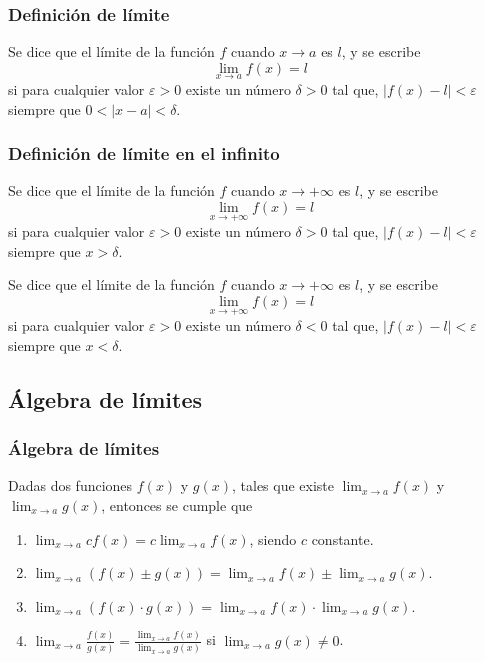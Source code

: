 \begin{frame}
	\frametitle{Definición de límite}
	\begin{definicion}
		Se dice que el límite de la función $f$ cuando $x\rightarrow a$ es $l$, y se escribe
		\[\lim_{x\rightarrow a} f(x) =l\]
		si para cualquier valor $\varepsilon>0$ existe un número $\delta>0$ tal que, $|f(x)-l|<\varepsilon$ siempre que $0<|x-a|<\delta$.
	\end{definicion}
	
	\begin{center}
		\scalebox{1}{}
	\end{center}
\end{frame}


\begin{frame}
	\frametitle{Definición de límite en el infinito}
	\begin{definicion}
		Se dice que el límite de la función $f$ cuando $x\rightarrow +\infty$ es $l$, y se escribe
		\[\lim_{x\rightarrow +\infty} f(x) =l\]
		si para cualquier valor $\varepsilon>0$ existe un número $\delta>0$ tal que, $|f(x)-l|<\varepsilon$ siempre que $x>\delta$.
		
		Se dice que el límite de la función $f$ cuando $x\rightarrow +\infty$ es $l$, y se escribe
		\[\lim_{x\rightarrow +\infty} f(x) =l\]
		si para cualquier valor $\varepsilon>0$ existe un número $\delta<0$ tal que, $|f(x)-l|<\varepsilon$ siempre que $x<\delta$.
	\end{definicion}
\end{frame}



\subsection{Álgebra de límites}
\begin{frame}
	\frametitle{Álgebra de límites}
	Dadas dos funciones $f(x)$ y $g(x)$, tales que existe $\lim_{x\rightarrow a}f(x)$ y $\lim_{x\rightarrow a}g(x)$, entonces se cumple que
	\begin{enumerate}
		\item $\displaystyle \lim_{x\rightarrow a}c f(x)=c\lim_{x\rightarrow a}f(x)$, siendo $c$ constante. 
		\item $\displaystyle \lim_{x\rightarrow a}(f(x)\pm g(x))=\lim_{x\rightarrow a}f(x)\pm \lim_{x\rightarrow a}g(x)$.
		\item $\displaystyle \lim_{x\rightarrow a}(f(x)\cdot g(x))=\lim_{x\rightarrow a}f(x)\cdot \lim_{x\rightarrow a}g(x)$.
		\item $\displaystyle \lim_{x\rightarrow a}\frac{f(x)}{g(x)}=\frac{\displaystyle \lim_{x\rightarrow
			      a}f(x)}{\displaystyle \lim_{x\rightarrow a}g(x)}$ si $\displaystyle \lim_{x\rightarrow a}g(x)\neq 0$.
		\end{enumerate}
	\end{frame}
	
